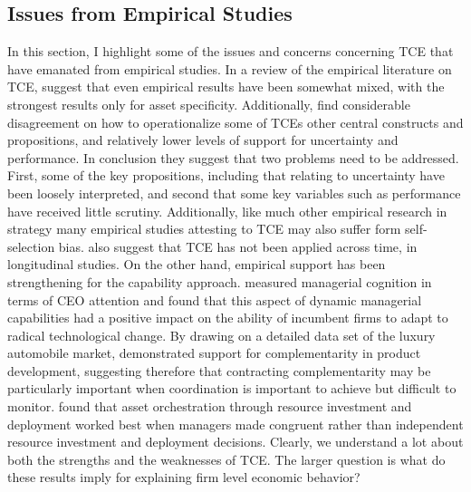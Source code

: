 \documentclass[12pt,letterpaper]{article}
\begin{document}
\subsection{Issues from Empirical Studies}
In this section, I highlight some of the issues and concerns concerning TCE that have emanated from empirical studies. In a review of the empirical literature on TCE, \cite{David2004} suggest that even empirical results have been somewhat mixed, with the strongest results only for asset specificity. Additionally, \cite{David2004} find considerable disagreement on how to operationalize some of TCE\textquotesingle s other central constructs and propositions, and relatively lower levels of support for uncertainty and performance. In conclusion they suggest that two problems need to be addressed. First, some of the key propositions, including that relating to uncertainty have been loosely interpreted, and second that some key variables such as performance have received little scrutiny. Additionally, like much other empirical research in strategy many empirical studies attesting to TCE may also suffer form self-selection bias. \cite{David2004} also suggest that TCE has not been applied across time, in longitudinal studies. 
On the other hand, empirical support has been strengthening for the capability approach. \cite{Eggers2009} measured managerial cognition in terms of CEO attention and found that this aspect of dynamic managerial capabilities had a positive impact on the ability of incumbent firms to adapt to radical technological change. By drawing on a detailed data set of the luxury automobile market, \cite{Novak2009} demonstrated support for complementarity in product development, suggesting therefore that contracting complementarity may be particularly important when coordination is important to achieve but difficult to monitor. \cite{Sirmon2009} found that asset orchestration through resource investment and deployment worked best when managers made congruent rather than independent resource investment and deployment decisions. Clearly, we understand a lot about both the strengths and the weaknesses of TCE. The larger question is what do these results imply for explaining firm level economic behavior?
\end{document}

